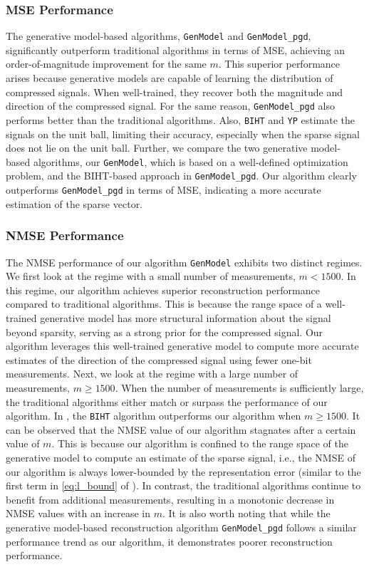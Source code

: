 \documentclass[journal]{IEEEtran}
\begin{document}
\subsubsection{MSE Performance} 
The generative model-based algorithms, \texttt{GenModel} and \texttt{GenModel\_pgd}, significantly outperform traditional algorithms in terms of MSE, achieving an order-of-magnitude improvement for the same $m$. This superior performance arises because generative models are capable of learning the distribution of compressed signals. When well-trained, they recover both the magnitude and direction of the compressed signal. For the same reason, \texttt{GenModel\_pgd} also performs better than the traditional algorithms. Also, \texttt{BIHT} and \texttt{YP} estimate the signals on the unit ball, limiting their accuracy, especially when the sparse signal does not lie on the unit ball.  Further, we compare the two generative model-based algorithms, our \texttt{GenModel}, which is based on a well-defined optimization problem, and the BIHT-based approach in \texttt{GenModel\_pgd}. Our algorithm clearly outperforms \texttt{GenModel\_pgd} in terms of MSE, indicating a more accurate estimation of the sparse vector.

\subsubsection{NMSE Performance}
The NMSE performance of our algorithm \texttt{GenModel} exhibits two distinct regimes. We first look at the regime with a small number of measurements, $m<1500$.  In this regime, our algorithm achieves superior reconstruction performance compared to traditional algorithms. This is because the range space of a well-trained generative model has more structural information about the signal beyond sparsity, serving as a strong prior for the compressed signal. Our algorithm leverages this well-trained generative model to compute more accurate estimates of the direction of the compressed signal using fewer one-bit measurements.  Next, we look at the regime with a large number of measurements, $m\geq1500$. When the number of measurements is sufficiently large, the traditional algorithms either match or surpass the performance of our algorithm. In , the \texttt{BIHT} algorithm outperforms our algorithm when $m \geq 1500.$ It can be observed that the NMSE value of our algorithm stagnates after a certain value of $m$. This is because our algorithm is confined to the range space of the generative model to compute an estimate of the sparse signal, i.e., the NMSE of our algorithm is always lower-bounded by the representation error (similar to the first term in \eqref{eq:l_bound} of ). 
In contrast, the traditional algorithms continue to benefit from additional measurements, resulting in a monotonic decrease in NMSE values with an increase in $m$. 
It is also worth noting that while the generative model-based reconstruction algorithm \texttt{GenModel\_pgd} follows a similar performance trend as our algorithm, it demonstrates poorer reconstruction performance.
\end{document}
